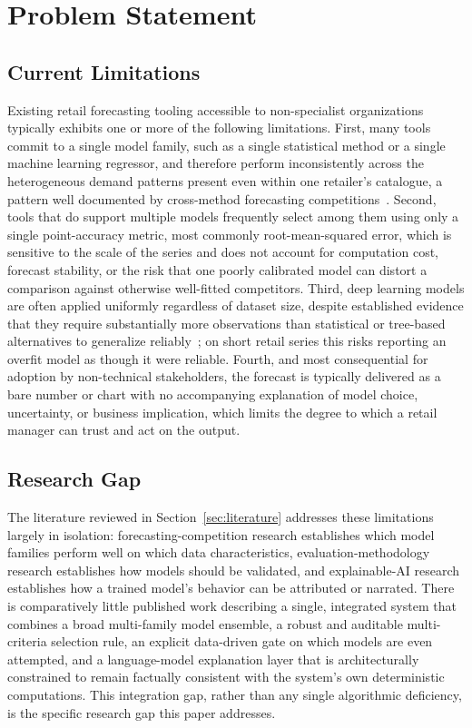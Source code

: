 \section{Problem Statement}
\label{sec:problem}

\subsection{Current Limitations}
Existing retail forecasting tooling accessible to non-specialist organizations typically exhibits one or more of the following limitations. First, many tools commit to a single model family, such as a single statistical method or a single machine learning regressor, and therefore perform inconsistently across the heterogeneous demand patterns present even within one retailer's catalogue, a pattern well documented by cross-method forecasting competitions~\cite{makridakis2020m4,makridakis2022m5}. Second, tools that do support multiple models frequently select among them using only a single point-accuracy metric, most commonly root-mean-squared error, which is sensitive to the scale of the series and does not account for computation cost, forecast stability, or the risk that one poorly calibrated model can distort a comparison against otherwise well-fitted competitors. Third, deep learning models are often applied uniformly regardless of dataset size, despite established evidence that they require substantially more observations than statistical or tree-based alternatives to generalize reliably~\cite{lim2021survey}; on short retail series this risks reporting an overfit model as though it were reliable. Fourth, and most consequential for adoption by non-technical stakeholders, the forecast is typically delivered as a bare number or chart with no accompanying explanation of model choice, uncertainty, or business implication, which limits the degree to which a retail manager can trust and act on the output.

\subsection{Research Gap}
The literature reviewed in Section~\ref{sec:literature} addresses these limitations largely in isolation: forecasting-competition research establishes which model families perform well on which data characteristics, evaluation-methodology research establishes how models should be validated, and explainable-AI research establishes how a trained model's behavior can be attributed or narrated. There is comparatively little published work describing a single, integrated system that combines a broad multi-family model ensemble, a robust and auditable multi-criteria selection rule, an explicit data-driven gate on which models are even attempted, and a language-model explanation layer that is architecturally constrained to remain factually consistent with the system's own deterministic computations. This integration gap, rather than any single algorithmic deficiency, is the specific research gap this paper addresses.

